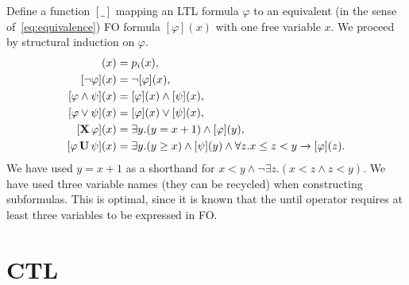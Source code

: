 \begin{solution}
	Define a function $[\_]$ mapping an LTL formula $\varphi$
	to an equivalent (in the sense of~\cref{eq:equivalence}) FO formula $[\varphi](x)$
	with one free variable $x$.
	We proceed by structural induction on $\varphi$.
	\begin{align*}
		[p_i](x) &= p_i(x), \\
		[\neg \varphi](x) &= \neg [\varphi](x), \\
		[\varphi \land \psi](x) &= [\varphi](x) \land [\psi](x), \\
		[\varphi \lor \psi](x) &= [\varphi](x) \lor [\psi](x), \\
		[\X \varphi](x) &= \exists y. (y = x + 1) \land [\varphi](y), \\
		[\varphi \U \psi](x) &= \exists y. (y \geq x) \land [\psi](y) \land
			\forall z. x \leq z < y \to [\varphi](z).
	\end{align*}
	We have used $y = x + 1$ as a shorthand for $x < y \land \neg \exists z. (x < z \land z < y)$.
	We have used three variable names (they can be recycled) when constructing subformulas.
	This is optimal, since it is known that the until operator requires at least three variables to be expressed in FO.
\end{solution}




\section*{CTL}

